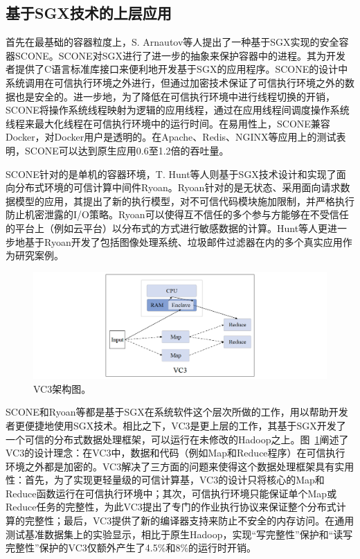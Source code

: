 \subsection{基于SGX技术的上层应用}

首先在最基础的容器粒度上，S. Arnautov等人提出了一种基于SGX实现的安全容器SCONE\parencite{arnautov2016scone}。SCONE对SGX进行了进一步的抽象来保护容器中的进程。其为开发者提供了C语言标准库接口来便利地开发基于SGX的应用程序。SCONE的设计中系统调用在可信执行环境之外进行，但通过加密技术保证了可信执行环境之外的数据也是安全的。进一步地，为了降低在可信执行环境中进行线程切换的开销，SCONE将操作系统线程映射为逻辑的应用线程，通过在应用线程间调度操作系统线程来最大化线程在可信执行环境中的运行时间。在易用性上，SCONE兼容Docker，对Docker用户是透明的。在Apache、Redis、NGINX等应用上的测试表明，SCONE可以达到原生应用0.6至1.2倍的吞吐量。

SCONE针对的是单机的容器环境，T. Hunt等人则基于SGX技术设计和实现了面向分布式环境的可信计算中间件Ryoan\parencite{hunt2018ryoan}。Ryoan针对的是无状态、采用面向请求数据模型的应用，其提出了新的执行模型，对不可信代码模块施加限制，并严格执行防止机密泄露的I/O策略。Ryoan可以使得互不信任的多个参与方能够在不受信任的平台上（例如云平台）以分布式的方式进行敏感数据的计算。Hunt等人更进一步地基于Ryoan开发了包括图像处理系统、垃圾邮件过滤器在内的多个真实应用作为研究案例。

\begin{figure}[h]
    \centerline{\includegraphics[width=\textwidth]{figures/vc3-arch.png}}
    \caption{VC3架构图。}
    \label{vc3_arch}
\end{figure}

SCONE和Ryoan等都是基于SGX在系统软件这个层次所做的工作，用以帮助开发者更便捷地使用SGX技术。相比之下，VC3\parencite{schuster2015vc3}是更上层的工作，其基于SGX开发了一个可信的分布式数据处理框架，可以运行在未修改的Hadoop之上。图~\ref{vc3_arch}阐述了VC3的设计理念：在VC3中，数据和代码（例如Map和Reduce程序）在可信执行环境之外都是加密的。VC3解决了三方面的问题来使得这个数据处理框架具有实用性：首先，为了实现更轻量级的可信计算基，VC3的设计只将核心的Map和Reduce函数运行在可信执行环境中；其次，可信执行环境只能保证单个Map或Reduce任务的完整性，为此VC3提出了专门的作业执行协议来保证整个分布式计算的完整性；最后，VC3提供了新的编译器支持来防止不安全的内存访问。在通用测试基准数据集上的实验显示，相比于原生Hadoop，实现“写完整性”保护和“读写完整性”保护的VC3仅额外产生了4.5\%和8\%的运行时开销。

